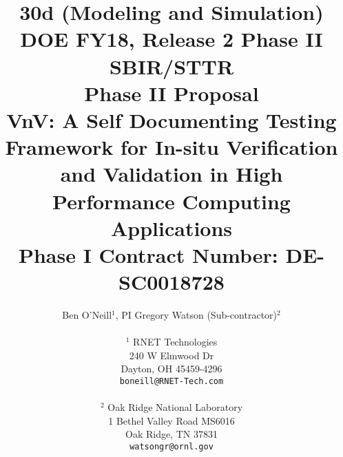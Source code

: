 \title{30d (Modeling and Simulation)\\
DOE FY18, Release 2 Phase II SBIR/STTR \\
\vspace{0.25in}Phase II Proposal\\
\vspace{0.25in} VnV: A Self Documenting Testing Framework for In-situ Verification and Validation in High Performance Computing Applications\\
Phase I Contract Number: DE-SC0018728\\
\vspace{0.15in}}
\author{Ben O'Neill$^1$, PI \hspace{0.75in} Gregory Watson (Sub-contractor)$^2$\\
  \\$^1$ RNET Technologies\\
  240 W Elmwood Dr\\
  Dayton, OH 45459-4296\\
  {\tt boneill@RNET-Tech.com}\\\\
  $^2$ Oak Ridge National Laboratory\\
  1 Bethel Valley Road MS6016\\
  Oak Ridge, TN 37831\\
  {\tt watsongr@ornl.gov}
}


